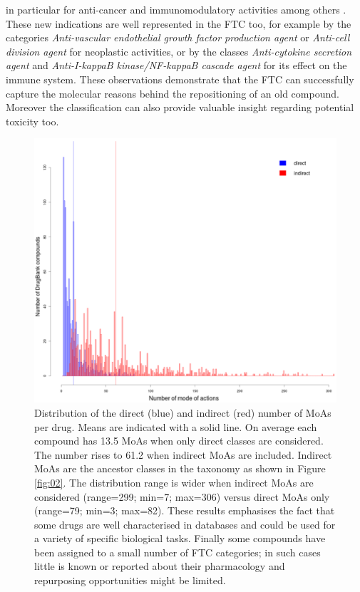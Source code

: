 \documentclass{bioinfo}
\begin{document}
in particular for anti-cancer and immunomodulatory activities among others \citep{teo2005thalidomide}.
These new indications are well represented in the FTC too, for 
example by the categories \emph{Anti-vascular endothelial growth factor production agent} or 
\emph{Anti-cell division agent} for neoplastic activities, 
or by the classes \emph{Anti-cytokine secretion agent} and \emph{Anti-I-kappaB kinase/NF-kappaB cascade agent} for its effect
on the immune system. These observations demonstrate that the FTC can successfully capture the 
molecular reasons behind the repositioning of an old compound. 
Moreover the classification can also provide valuable insight regarding
potential toxicity too.


\begin{figure}[!tpb]%
\centerline{\includegraphics{fig3.png}}
\caption{Distribution of the direct (blue) and indirect (red) number of MoAs per drug.
Means are indicated with a solid line. On average each compound has 13.5 MoAs when only direct classes are considered. The number rises
to 61.2 when indirect MoAs are included. Indirect MoAs are the ancestor classes in the taxonomy as shown in Figure \ref{fig:02}.
The distribution range is wider when indirect MoAs are considered (range=299; min=7; max=306) versus direct MoAs only (range=79; min=3; max=82).
These results emphasises the fact that some drugs
are well characterised in databases and could be used for a variety of specific biological tasks. Finally some compounds have been assigned
to a small number of FTC categories; in such cases little is known or reported about their pharmacology and repurposing opportunities
might be limited.}\label{fig:03}
\end{figure}
\end{document}
